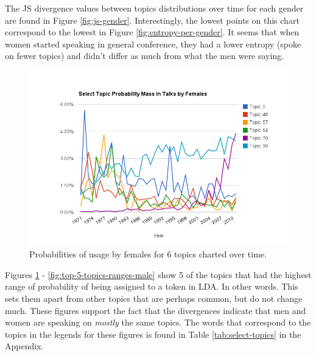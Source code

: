 The JS divergence values between topics distributions over time for each gender are found in Figure \ref{fig:js-gender}. Interestingly, the lowest points on this chart correspond to the lowest in Figure \ref{fig:entropy-per-gender}. It seems that when women started speaking in general conference, they had a lower entropy (spoke on fewer topics) and didn't differ as much from what the men were saying. 

\begin{figure}[center]
	\centering
	\includegraphics[width=14cm]{images/ToT(females).png}
	\caption{Probabilities of usage by females for 6 topics charted over time.}
	\label{fig:top-5-topics-ranges-female}
\end{figure}

Figures \ref{fig:top-5-topics-ranges-female} - \ref{fig:top-5-topics-ranges-male} show 5 of the  topics that had the highest range of probability of being assigned to a token in LDA. In other words. This sets them apart from other topics that are perhaps common, but do not change much. These figures support the fact that the divergences indicate that men and women are speaking on \textit{mostly} the same topics. The words that correspond to the topics in the legends for these figures is found in Table \ref{tab:select-topics} in the Appendix.


